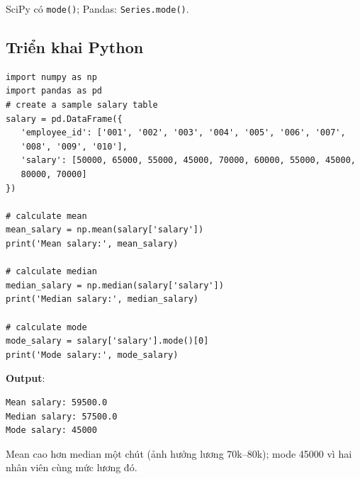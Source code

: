 \begin{phuongphap}[title={Python}]
SciPy có \texttt{mode()}; Pandas: \texttt{Series.mode()}.
\end{phuongphap}

\subsection{Triển khai Python}

\begin{vidu}[title={Bảng lương mẫu}]
\begin{lstlisting}
import numpy as np
import pandas as pd
# create a sample salary table
salary = pd.DataFrame({
   'employee_id': ['001', '002', '003', '004', '005', '006', '007',
   '008', '009', '010'],
   'salary': [50000, 65000, 55000, 45000, 70000, 60000, 55000, 45000,
   80000, 70000]
})

# calculate mean
mean_salary = np.mean(salary['salary'])
print('Mean salary:', mean_salary)

# calculate median
median_salary = np.median(salary['salary'])
print('Median salary:', median_salary)

# calculate mode
mode_salary = salary['salary'].mode()[0]
print('Mode salary:', mode_salary)
\end{lstlisting}

\textbf{Output}:
\begin{lstlisting}
Mean salary: 59500.0
Median salary: 57500.0
Mode salary: 45000
\end{lstlisting}
\end{vidu}

\begin{ynghia}[title={Đọc kết quả}]
Mean cao hơn median một chút (ảnh hưởng lương 70k--80k); mode 45000 vì hai nhân viên cùng mức lương đó.
\end{ynghia}

